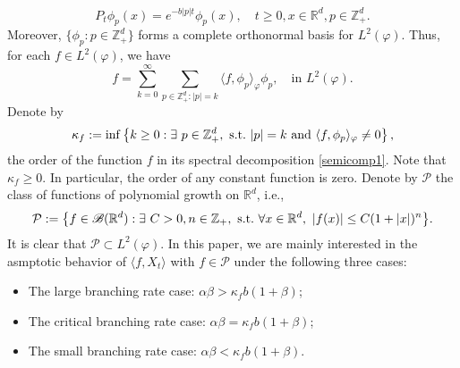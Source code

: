 \documentclass[12pt,a4paper]{amsart}
\theoremstyle{plain}
\theoremstyle{definition}
\numberwithin{equation}{section}
\begin{document}
\begin{equation}
    P_t\phi_p(x)
    =e^{-b|p|t}\phi_p(x),
    \quad t\geq 0, x\in \mathbb R^d, p\in \mathbb Z_+^d.
\end{equation}
    Moreover, $\{\phi_p: p \in \mathbb Z_+^d\}$ forms a complete orthonormal basis for $L^2(\varphi)$.
    Thus, for each $f\in L^2(\varphi)$, we have
\begin{equation}\label{semicomp1}
    f
    =\sum_{k=0}^{\infty}\sum_{p\in \mathbb Z_+^d:|p|=k}\langle f, \phi_p \rangle_{\varphi} \phi_p,
    \quad \text{in~} L^2(\varphi).
\end{equation}
    Denote by
\begin{equation}
    \kappa_f
    :=\inf \left \{k\geq 0: \exists ~ p\in \mathbb Z_+^d ,{\rm ~s.t.~}|p|=k {\rm ~and~}  \langle f, \phi_p \rangle_{\varphi}\neq 0\right \},
\end{equation}
    the order of the function $f$ in its spectral decomposition \eqref{semicomp1}.
    Note that $ \kappa_f\geq 0$.
    In particular, the order of any constant function is zero.
    Denote by $\mathcal P$ the class of functions of polynomial growth on $\mathbb R^d$, i.e.,
\begin{equation}
\label{eq: polynomial growth function}
    \mathcal{P}
    :=\big \{f\in \mathscr B(\mathbb R^d):\exists~ C>0, n \in \mathbb Z_+, {\rm ~s.t.~} \forall x\in \mathbb R^d,~ |f(x)|\leq C(1+|x|)^n\big\}.
\end{equation}
    It is clear that $\mathcal{P} \subset L^2(\varphi)$.
    In this paper, we are mainly interested in the asmptotic behavior of $\langle f, X_t\rangle$ with $f\in \mathcal P$ under the following three cases:
\begin{itemize}
\item
    The large branching rate case: $\alpha\beta>\kappa_fb(1+\beta)$;
\item
    The critical branching rate case: $\alpha\beta=\kappa_fb(1+\beta)$;
\item
    The small branching rate case: $\alpha\beta<\kappa_fb(1+\beta)$.
\end{itemize}
\end{document}

